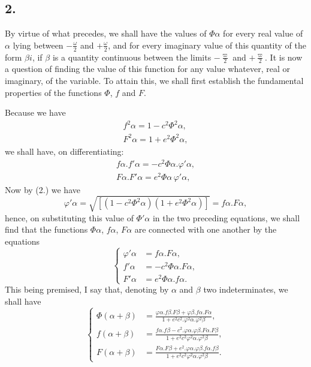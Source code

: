 \documentclass{article}
\begin{document}
\subsection*{2.}

By virtue of what precedes, we shall have the values of $\Phi\alpha$ for every real value of $\alpha$ lying between $-\frac{\omega}{2}$ and $+\frac{\omega}{2}$, and for every imaginary value of this quantity of the form $\beta i$, if $\beta$ is a quantity continuous between the limits $-\frac{\varpi}{2}$ and $+\frac{\varpi}{2}$. It is now a question of finding the value of this function for any value whatever, real or imaginary, of the variable. To attain this, we shall first establish the fundamental properties of the functions $\Phi$, $f$ and $F$.

Because we have
\[ \begin{gathered} f^{2}\alpha=1-c^{2}\Phi^{2}\alpha,\\ F^{2}\alpha=1+e^{2}\Phi^{2}\alpha, \end{gathered} \]
we shall have, on differentiating:
\[ \begin{gathered} f\alpha.f'\alpha=-c^{2}\Phi\alpha.\varphi'\alpha,\\ F\alpha.F'\alpha=e^{2}\Phi\alpha\,\varphi'\alpha, \end{gathered} \]
Now by (2.) we have
\[ \varphi'\alpha=\sqrt{[(1-c^{2}\Phi^{2}\alpha)(1+e^{2}\Phi^{2}\alpha)]}=f\alpha.F\alpha, \]
hence, on substituting this value of $\Phi'\alpha$ in the two preceding equations, we shall find that the functions $\Phi\alpha$, $f\alpha$, $F\alpha$ are connected with one another by the equations
\[ \left\{\begin{aligned} \varphi'\alpha&=f\alpha.F\alpha,\\ f'\alpha&=-c^{2}\Phi\alpha.F\alpha,\\ F'\alpha&=e^{2}\Phi\alpha.f\alpha. \end{aligned}\right. \tag{9.} \]
This being premised, I say that, denoting by $\alpha$ and $\beta$ two indeterminates, we shall have
\[ \left\{\begin{aligned} \Phi(\alpha+\beta)&=\frac{\varphi\alpha.f\beta.F\beta+\varphi\beta.f\alpha.F\alpha}{1+e^{2}c^{2}.\varphi^{2}\alpha.\varphi^{2}\beta},\\ f(\alpha+\beta)&=\frac{f\alpha.f\beta-c^{2}.\varphi\alpha.\varphi\beta.F\alpha.F\beta}{1+e^{2}c^{2}\varphi^{2}\alpha.\varphi^{2}\beta},\\ F(\alpha+\beta)&=\frac{F\alpha.F\beta+e^{2}.\varphi\alpha.\varphi\beta.f\alpha.f\beta}{1+e^{2}c^{2}\varphi^{2}\alpha.\varphi^{2}\beta}. \end{aligned}\right. \tag{10.} \]
\end{document}
